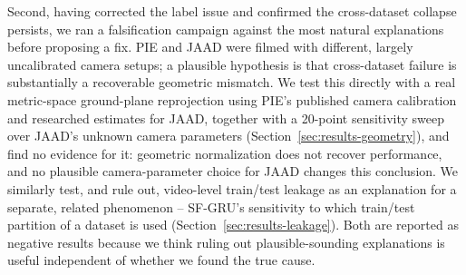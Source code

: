 Second, having corrected the label issue and confirmed the
cross-dataset collapse persists, we ran a falsification campaign
against the most natural explanations before proposing a fix. PIE and
JAAD were filmed with different, largely uncalibrated camera setups; a
plausible hypothesis is that cross-dataset failure is substantially a
recoverable geometric mismatch. We test this directly with a real
metric-space ground-plane reprojection using PIE's published camera
calibration and researched estimates for JAAD, together with a 20-point
sensitivity sweep over JAAD's unknown camera parameters
(Section~\ref{sec:results-geometry}), and find no evidence for it:
geometric normalization does not recover performance, and no plausible
camera-parameter choice for JAAD changes this conclusion. We similarly
test, and rule out, video-level train/test leakage as an explanation
for a separate, related phenomenon -- SF-GRU's sensitivity to which
train/test partition of a dataset is used
(Section~\ref{sec:results-leakage}). Both are reported as negative
results because we think ruling out plausible-sounding explanations is
useful independent of whether we found the true cause.

